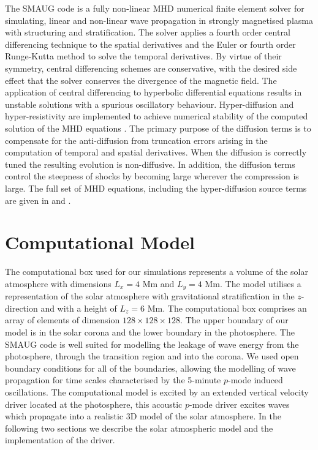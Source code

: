 \documentclass{aastex62}
\begin{document}
The SMAUG code is a fully non-linear MHD numerical finite element solver for simulating, linear and non-linear wave propagation in strongly magnetised plasma with structuring and stratification. The solver applies a fourth order central differencing technique to the spatial derivatives and the Euler or fourth order Runge-Kutta method to solve the temporal derivatives. By virtue of their symmetry, central differencing schemes are conservative, with the desired side effect that the solver conserves the divergence of the magnetic field. The application of central differencing to hyperbolic differential equations results in unstable solutions with a spurious oscillatory behaviour.  Hyper-diffusion and hyper-resistivity are implemented to achieve numerical stability of the computed solution of the MHD equations \citep[see for example][]{Caunt2001}.  The primary purpose of the diffusion terms is to compensate for the anti-diffusion from truncation errors arising in the computation of temporal and spatial derivatives. When the diffusion is correctly tuned the resulting evolution is non-diffusive. In addition, the diffusion terms control the steepness of shocks by becoming large wherever the compression is large. The full set of MHD equations, including the hyper-diffusion source terms are given in \citet{Griffiths2015} and \citet{Shelyag2008}.


\section{Computational Model}
The computational box used for our simulations represents a volume of the solar atmosphere  with dimensions $L_{ x}= 4$ Mm and $L_{y} =4$ Mm. The model utilises a representation of the solar atmosphere with gravitational stratification in the $z$-direction and with a height of $L_{z} =6$ Mm. The computational box comprises an array of elements of dimension $128 \times128 \times128$. The upper boundary of our model  is in the solar corona and the lower boundary in the photosphere. The SMAUG code is well suited for modelling the leakage of wave energy from the photosphere, through the transition region and into the corona. We used open boundary conditions for all of the boundaries, allowing the modelling of wave propagation for time scales characterised by the 5-minute $p$-mode induced oscillations. The computational model is excited by an extended vertical velocity driver located at the photosphere, this acoustic $p$-mode driver excites waves which propagate into a realistic 3D model of the solar atmosphere. In the following two sections we describe the solar atmospheric model and the implementation of the driver. 
\end{document}
